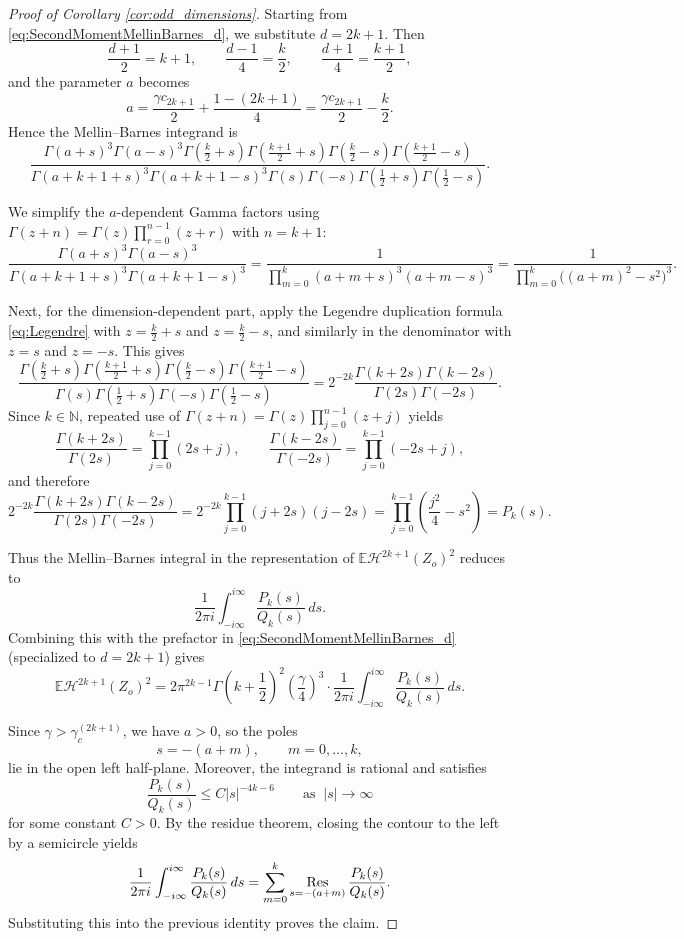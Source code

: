 \documentclass[11pt,a4paper]{article}
\theoremstyle{plain}
\theoremstyle{definition}
\theoremstyle{remark}
\def\EE{\mathbb{E}}
\def\cH{\mathcal{H}}
\newcommand{\Res}{\mathop{\mathrm{Res}}\nolimits}
\begin{document}
\begin{proof}[Proof of Corollary \ref{cor:odd_dimensions}]
	Starting from \eqref{eq:SecondMomentMellinBarnes_d}, we substitute \(d=2k+1\). Then
	\[
	\frac{d+1}{2}=k+1,
	\qquad
	\frac{d-1}{4}=\frac{k}{2},
	\qquad
	\frac{d+1}{4}=\frac{k+1}{2},
	\]
	and the parameter \(a\) becomes
	\[
	a=\frac{\gamma c_{2k+1}}{2}+\frac{1-(2k+1)}{4}
	=\frac{\gamma c_{2k+1}}{2}-\frac{k}{2}.
	\]
	Hence the Mellin--Barnes integrand is
	\[
	\frac{\Gamma(a+s)^3\Gamma(a-s)^3
		\Gamma\!\left(\frac{k}{2}+s\right)\Gamma\!\left(\frac{k+1}{2}+s\right)
		\Gamma\!\left(\frac{k}{2}-s\right)\Gamma\!\left(\frac{k+1}{2}-s\right)}
	{\Gamma(a+k+1+s)^3\Gamma(a+k+1-s)^3
		\Gamma(s)\Gamma(-s)\Gamma\!\left(\frac12+s\right)\Gamma\!\left(\frac12-s\right)}.
	\]
	
	We simplify the \(a\)-dependent Gamma factors using
	\(\Gamma(z+n)=\Gamma(z)\prod_{r=0}^{n-1}(z+r)\) with \(n=k+1\):
	\[
	\frac{\Gamma(a+s)^3\Gamma(a-s)^3}
	{\Gamma(a+k+1+s)^3\Gamma(a+k+1-s)^3}
	=
	\frac{1}{\prod_{m=0}^{k}(a+m+s)^3(a+m-s)^3}
	=
	\frac{1}{\prod_{m=0}^{k}\bigl((a+m)^2-s^2\bigr)^3}.
	\]
	
	Next, for the dimension-dependent part, apply the Legendre duplication formula \eqref{eq:Legendre}
	with \(z=\frac{k}{2}+s\) and \(z=\frac{k}{2}-s\), and similarly in the denominator with
	\(z=s\) and \(z=-s\). This gives
	\[
	\frac{\Gamma\!\left(\frac{k}{2}+s\right)\Gamma\!\left(\frac{k+1}{2}+s\right)
		\Gamma\!\left(\frac{k}{2}-s\right)\Gamma\!\left(\frac{k+1}{2}-s\right)}
	{\Gamma(s)\Gamma\!\left(\frac12+s\right)\Gamma(-s)\Gamma\!\left(\frac12-s\right)}
	=
	2^{-2k}\frac{\Gamma(k+2s)\Gamma(k-2s)}{\Gamma(2s)\Gamma(-2s)}.
	\]
	Since \(k\in\mathbb{N}\), repeated use of \(\Gamma(z+n)=\Gamma(z)\prod_{j=0}^{n-1}(z+j)\) yields
	\[
	\frac{\Gamma(k+2s)}{\Gamma(2s)}=\prod_{j=0}^{k-1}(2s+j),
	\qquad
	\frac{\Gamma(k-2s)}{\Gamma(-2s)}=\prod_{j=0}^{k-1}(-2s+j),
	\]
	and therefore
	\[
	2^{-2k}\frac{\Gamma(k+2s)\Gamma(k-2s)}{\Gamma(2s)\Gamma(-2s)}
	=
	2^{-2k}\prod_{j=0}^{k-1}(j+2s)(j-2s)
	=
	\prod_{j=0}^{k-1}\left(\frac{j^2}{4}-s^2\right)
	=P_k(s).
	\]
	
	Thus the Mellin--Barnes integral in the representation of $\EE\cH^{2k+1}(Z_o)^2$ reduces to
	\[
	\frac{1}{2\pi i}\int_{-i\infty}^{i\infty}\frac{P_k(s)}{Q_k(s)}\,ds.
	\]
	Combining this with the prefactor in \eqref{eq:SecondMomentMellinBarnes_d} (specialized to \(d=2k+1\))
	gives
	\[
	\EE \cH^{2k+1}(Z_o)^2
	=
	2\pi^{2k-1}\Gamma\!\left(k+\frac12\right)^2\left(\frac{\gamma}{4}\right)^3
	\cdot
	\frac{1}{2\pi i}\int_{-i\infty}^{i\infty}\frac{P_k(s)}{Q_k(s)}\,ds.
	\]
	
	Since \(\gamma>\gamma_c^{(2k+1)}\), we have \(a>0\), so the poles
	\[
	s=-(a+m),\qquad m=0,\dots,k,
	\]
	lie in the open left half-plane. Moreover, the integrand is rational and satisfies
	\[
	\frac{P_k(s)}{Q_k(s)} \leq C|s|^{-4k-6}\qquad \text{as}\;\;|s|\to\infty
	\]
    for some constant $C>0$.
	By the residue theorem, closing the contour to the left by a semicircle yields
	\[
	\frac{1}{2\pi i}\int_{-i\infty}^{i\infty}\frac{P_k(s)}{Q_k(s)}\,ds
	=
	\sum_{m=0}^{k}\Res\limits_{s=-(a+m)}\frac{P_k(s)}{Q_k(s)}.
	\]
	Substituting this into the previous identity proves the claim.
\end{proof}
\end{document}
